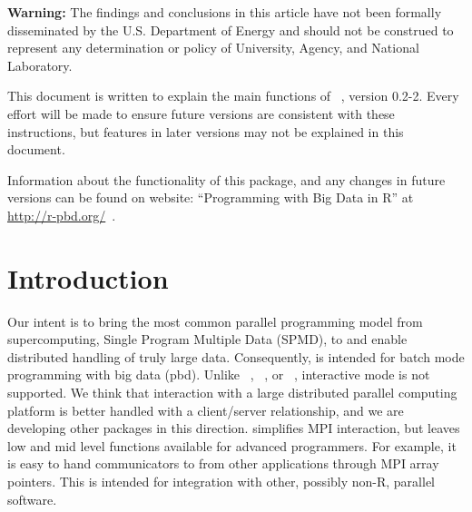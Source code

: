 
{\color{red} \bf Warning:}
The findings and conclusions in this article have not been
formally disseminated by the U.S. Department of Energy
and should not be construed to represent any determination or
policy of University, Agency, and National Laboratory.

This document is written to explain the main
functions of ~\citep{Chen2012}, version 0.2-2.
Every effort will be made to ensure future versions are consistent with
these instructions, but features in later versions may not be explained
in this document.

Information about the functionality of this package,
and any changes in future versions can be found on website:
``Programming with Big Data in R'' at
\url{http://r-pbd.org/}~\citep{pbdR2012}.




\section[Introduction]{Introduction}
\label{sec:introduction}

Our intent is to bring the most common parallel programming model from
supercomputing, Single Program Multiple Data (SPMD), to 
and enable distributed handling of truly large data. Consequently,
 is intended for batch mode programming with big data
(pbd). Unlike ~\citep{Yu2002},
~\citep{Tierney2012}, or ~\citep{Rcore},
interactive mode is not supported.  We think that interaction with a
large distributed parallel computing platform is better handled with a
client/server relationship, and we are developing other packages in
this direction.   simplifies MPI interaction, but leaves
low and mid level functions available for advanced programmers. For
example, it is easy to hand communicators to  from other
applications through MPI array pointers. This is intended for
integration with other, possibly non-R, parallel software.


